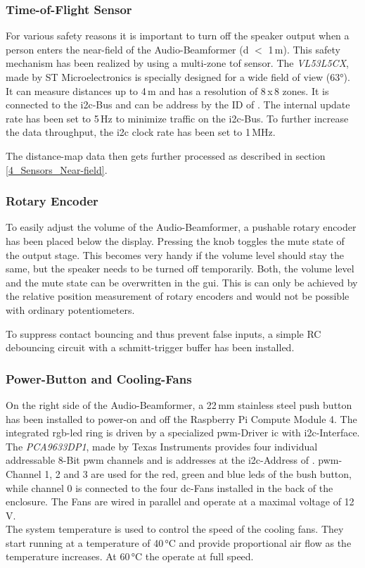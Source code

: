 \subsubsection{Time-of-Flight Sensor}
For various safety reasons it is important to turn off the speaker output when a person enters the near-field of the Audio-Beamformer (d $<$ 1\,m). This safety mechanism has been realized by using a multi-zone \acrfull{tof} sensor. The \textit{VL53L5CX}, made by ST Microelectronics is specially designed for a wide field of view (63°). It can measure distances up to 4\,m and has a resolution of 8\,x\,8 zones. It is connected to the \acrshort{i2c}-Bus and can be address by the ID of . The internal update rate has been set to 5\,Hz to minimize traffic on the \acrshort{i2c}-Bus. To further increase the data throughput, the \acrshort{i2c} clock rate has been set to 1\,MHz.

The distance-map data then gets further processed as described in section \ref{4_Sensors_Near-field}.

\newpage
\subsubsection{Rotary Encoder}
To easily adjust the volume of the Audio-Beamformer, a pushable rotary encoder has been placed below the display. Pressing the knob toggles the mute state of the output stage. This becomes very handy if the volume level should stay the same, but the speaker needs to be turned off temporarily. Both, the volume level and the mute state can be overwritten in the \acrshort{gui}. This is can only be achieved by the relative position measurement of rotary encoders and would not be possible with ordinary potentiometers.

To suppress contact bouncing and thus prevent false inputs, a simple RC debouncing circuit with a schmitt-trigger buffer has been installed.

\subsubsection{Power-Button and Cooling-Fans}
On the right side of the Audio-Beamformer, a 22\,mm stainless steel push button has been installed to power-on and off the Raspberry Pi Compute Module 4. The integrated \acrshort{rgb}-\acrshort{led} ring is driven by a specialized \acrshort{pwm}-Driver \acrshort{ic} with \acrshort{i2c}-Interface. The \textit{PCA9633DP1}, made by Texas Instruments provides four individual addressable 8-Bit \acrshort{pwm} channels and is addresses at the \acrshort{i2c}-Address of . \acrshort{pwm}-Channel 1, 2 and 3 are used for the red, green and blue \acrshort{led}s of the bush button, while channel 0 is connected to the four \acrshort{dc}-Fans installed in the back of the enclosure. The Fans are wired in parallel and operate at a maximal voltage of 12\,V.\\
The system temperature is used to control the speed of the cooling fans. They start running at a temperature of 40\,°C and provide proportional air flow as the temperature increases. At 60\,°C the operate at full speed.

